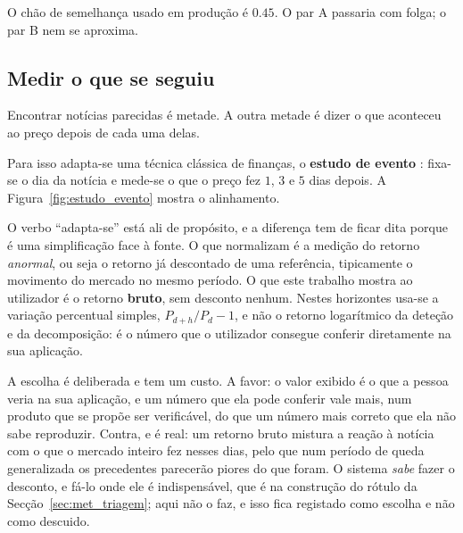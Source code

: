 O chão de semelhança usado em produção é $0.45$. O par A passaria com folga; o par B nem se aproxima.

\subsection{Medir o que se seguiu}

Encontrar notícias parecidas é metade. A outra metade é dizer o que aconteceu ao preço depois de cada
uma delas.

Para isso adapta-se uma técnica clássica de finanças, o \textbf{estudo de evento}
\autocite{brown1985daily}: fixa-se o dia da notícia e mede-se o que o preço fez $1$, $3$ e $5$ dias
depois. A Figura~\ref{fig:estudo_evento} mostra o alinhamento.

O verbo ``adapta-se'' está ali de propósito, e a diferença tem de ficar dita porque é uma
simplificação face à fonte. O que \textcite{brown1985daily} normalizam é a medição do retorno
\emph{anormal}, ou seja o retorno já descontado de uma referência, tipicamente o movimento do
mercado no mesmo período. O que este trabalho mostra ao utilizador é o retorno \textbf{bruto},
sem desconto nenhum. Nestes horizontes usa-se a variação percentual simples,
$P_{d+h}/P_d-1$, e não o retorno logarítmico da deteção e da decomposição: é o número que o
utilizador consegue conferir diretamente na sua aplicação.

A escolha é deliberada e tem um custo. A favor: o valor exibido é o que a pessoa veria na sua
aplicação, e um número que ela pode conferir vale mais, num produto que se propõe ser verificável,
do que um número mais correto que ela não sabe reproduzir. Contra, e é real: um retorno bruto mistura
a reação à notícia com o que o mercado inteiro fez nesses dias, pelo que num período de queda
generalizada os precedentes parecerão piores do que foram. O sistema \emph{sabe} fazer o desconto,
e fá-lo onde ele é indispensável, que é na construção do rótulo da Secção~\ref{sec:met_triagem};
aqui não o faz, e isso fica registado como escolha e não como descuido.

